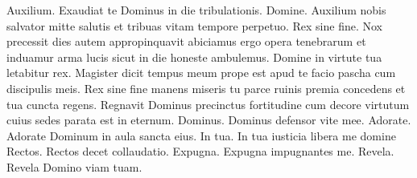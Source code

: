 \begin{multicols*}{2}
 Auxilium.
 Exaudiat te Dominus in die tribulationis.
 Domine.
 Auxilium nobis salvator mitte salutis et tribuas vitam tempore perpetuo.
 Rex sine fine.
 Nox precessit dies autem appropinquavit abiciamus ergo opera tenebrarum et induamur arma lucis sicut in die honeste ambulemus.
 Domine in virtute tua letabitur rex.
 Magister dicit tempus meum prope est apud te facio pascha cum discipulis meis.
 Rex sine fine manens miseris tu parce ruinis premia concedens et tua cuncta regens.
 Regnavit Dominus precinctus fortitudine cum decore virtutum cuius sedes parata est in eternum.
 Dominus.
 Dominus defensor vite mee.
 Adorate.
 Adorate Dominum in aula sancta eius.
 In tua.
 In tua iusticia libera me domine
 Rectos.
 Rectos decet collaudatio.
 Expugna.
 Expugna impugnantes me.
 Revela.
 Revela Domino viam tuam.

\end{multicols*}
